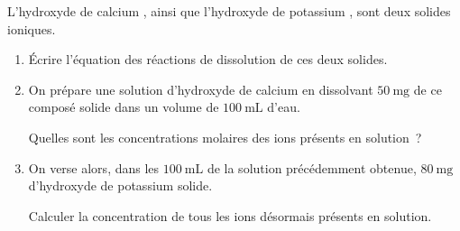 L'hydroxyde de calcium , ainsi que l'hydroxyde de potassium
, sont deux solides ioniques.
\begin{enumerate}
    \item Écrire l'équation des réactions de dissolution de ces deux solides.
    \item On prépare une solution d'hydroxyde de calcium en dissolvant
          $\qty{50}{\mg}$ de ce composé solide dans un volume de
          $\qty{100}{\mL}$ d'eau.
    
          Quelles sont les concentrations molaires des ions présents en
          solution~?
    \item On verse alors, dans les $\qty{100}{\mL}$ de la solution précédemment
          obtenue, $\qty{80}{\mg}$ d'hydroxyde de potassium solide.
    
          Calculer la concentration de tous les ions désormais présents en
          solution.
\end{enumerate}

